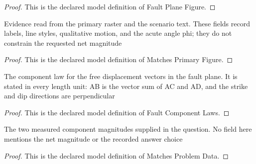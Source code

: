 \begin{proof}
  This is the declared model definition of Fault Plane Figure.
\end{proof}
\begin{definition}
  \label{def:physics:phyx-mini-0735:phyxminiproblems-problemphyxmini0735-matchesprimaryfigure}
  Evidence read from the primary raster and the scenario text. These fields record labels, line styles, qualitative motion, and the acute angle phi; they do not constrain the requested net magnitude
\end{definition}
\begin{proof}
  This is the declared model definition of Matches Primary Figure.
\end{proof}
\begin{definition}
  \label{def:physics:phyx-mini-0735:phyxminiproblems-problemphyxmini0735-faultcomponentlaws}
  The component law for the free displacement vectors in the fault plane. It is stated in every length unit: AB is the vector sum of AC and AD, and the strike and dip directions are perpendicular
\end{definition}
\begin{proof}
  This is the declared model definition of Fault Component Laws.
\end{proof}
\begin{definition}
  \label{def:physics:phyx-mini-0735:phyxminiproblems-problemphyxmini0735-matchesproblemdata}
  The two measured component magnitudes supplied in the question. No field here mentions the net magnitude or the recorded answer choice
\end{definition}
\begin{proof}
  This is the declared model definition of Matches Problem Data.
\end{proof}
